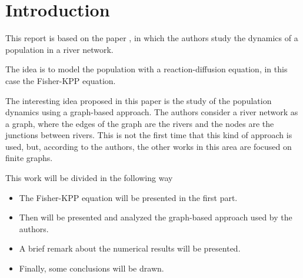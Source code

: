 \section{Introduction}
This report is based on the paper \cite{du2019fisherkpp}, in which the authors study the dynamics of a population in a river network.

The idea is to model the population with a reaction-diffusion equation, in this case the Fisher-KPP equation. 

The interesting idea proposed in this paper is the study of the population dynamics using a graph-based approach. The authors consider a river network as a graph, where the edges of the graph are the rivers and the nodes are the junctions between rivers. This is not the first time that this kind of approach is used, but, according to the authors, the other works in this area are focused on finite graphs.

This work will be divided in the following way
\begin{itemize}
    \item The Fisher-KPP equation will be presented in the first part.
    \item Then will be presented and analyzed the graph-based approach used by the authors.
    \item A brief remark about the numerical results will be presented.
    \item Finally, some conclusions will be drawn.
\end{itemize}

